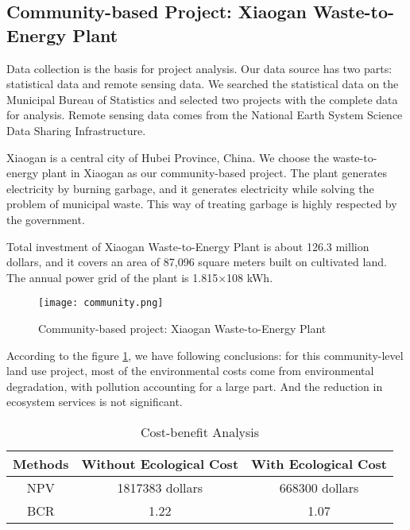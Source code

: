 \documentclass{mcmthesis}
\begin{document}
		\subsection{Community-based Project: Xiaogan Waste-to-Energy Plant}
		
		Data collection is the basis for project analysis. Our data source has two parts: statistical data and remote sensing data. We searched the statistical data on the Municipal Bureau of Statistics and selected two projects with the complete data for analysis. Remote sensing data comes from the National Earth System Science Data Sharing Infrastructure.
		
		Xiaogan is a central city of Hubei Province, China. We choose the waste-to-energy plant in Xiaogan as our community-based project. The plant generates electricity by burning garbage, and it generates electricity while solving the problem of municipal waste. This way of treating garbage is highly respected by the government.
		
		
		Total investment of Xiaogan Waste-to-Energy Plant is about 126.3 million dollars, and it covers an area of 87,096 square meters built on cultivated land. The annual power grid of the plant is 1.815×108 kWh.
		
		\begin{figure}[h]
			\small
			\centering
			\texttt{[image: community.png]}
			\caption{Community-based project: Xiaogan Waste-to-Energy Plant}
			\label{fig:community}
		\end{figure}
	
		According to the figure \ref{fig:community}, we have following conclusions: for this community-level land use project, most of the environmental costs come from environmental degradation, with pollution accounting for a large part. And the reduction in ecosystem services is not significant.
		
		\begin{table}[h]
			\centering
			\label{Ecological-Cost}
			\caption{Cost-benefit Analysis}
			\setlength{\tabcolsep}{3.7mm}
			\begin{tabular}{ccc}
				\toprule[1.5pt]  %
				Methods & Without Ecological Cost & With Ecological Cost  \\
				\midrule  %
				NPV & 1817383 dollars & 668300 dollars  \\
				BCR & 1.22 & 1.07  \\
				\bottomrule[1.5pt] %
			\end{tabular}
		\end{table}
		
\end{document}
